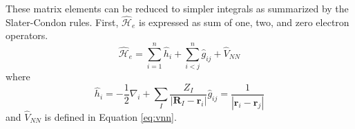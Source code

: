 \documentclass[final,3p,times,twocolumn]{elsarticle}
\newcommand{\ham}{\hat{\mathcal{H}}}
\begin{document}
These matrix elements can be reduced to simpler integrals as summarized by the Slater-Condon rules.\cite{condon} First, $\ham_e$ is expressed as sum of one, two, and zero electron operators.
\begin{equation}
\ham_e = \sum_{i=1}^n \hat h_i + \sum_{i < j}^n \hat g_{ij} + \hat V_{NN}
\end{equation}
where
\begin{subequations}
\begin{equation} \label{eq:h}
\hat h_i = -\dfrac{1}{2} \nabla_i + \sum_I \dfrac{Z_I}{|\mathbf{R}_I - \mathbf{r}_i|}
\end{equation}
\begin{equation} \label{eq:g}
\hat g_{ij} = \dfrac{1}{|\mathbf{r}_i - \mathbf{r}_j|}
\end{equation}
\end{subequations}
and $\hat V_{NN}$ is defined in Equation \eqref{eq:vnn}.
\end{document}
